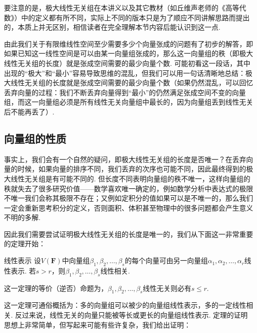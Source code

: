 要注意的是，极大线性无关组在本讲义以及其它教材（如丘维声老师的《高等代数》）中的定义都有所不同，实际上不同的版本只是为了顺应不同讲解思路而提出的，本质上并无区别，相信读者在完全理解本节内容后能认识到这一点.

由此我们关于有限维线性空间至少需要多少个向量张成的问题有了初步的解答，即如果已知这一线性空间是可以由某一向量组张成的，那么这一向量组的秩（即极大线性无关组的长度）就是张成空间需要的最少向量个数. 可能初看这一段话，其中出现的``极大''和``最小''容易导致思维的混乱，但我们可以用一句话清晰地总结：极大线性无关组的长度就是张成空间需要的最少向量个数（如果仍然混乱，可以回忆丢弃向量的过程：我们不断丢弃向量得到``最小''的仍然满足张成空间不变的向量组，而这一向量组必须是所有线性无关向量组中最长的，因为向量组丢到线性无关后不能再丢了）.

\subsection{向量组的性质}

事实上，我们会有一个自然的疑问，即极大线性无关组的长度是否唯一？在丢弃向量的时候，如果向量的排序不同，我们丢弃的次序也可能不同，因此最终得到的极大线性无关组是有可能不同的. 但长度不同表明向量组的秩不唯一，这样向量组的秩就失去了很多研究价值——数学喜欢唯一确定的，例如数学分析中表达式的极限不唯一我们会称其极限不存在；又例如定积分的值如果可以是不唯一的，那么我们一定会重新思考积分的定义，否则面积、体积甚至物理中的很多问题都会产生意义不明的多解.

因此我们需要尝试证明极大线性无关组的长度是唯一的，我们从下面这一非常重要的定理开始：
\begin{theorem}{}{线性表示}
    设$V(\mathbf{F})$中向量组$ \beta_1,\beta_2,\ldots,\beta_s $的每个向量可由另一向量组$\alpha_1,\alpha_2,\ldots,\alpha_r$线性表示. 若$s>r$，则$ \beta_1,\beta_2,\ldots,\beta_s $线性相关.
\end{theorem}
这一定理的等价（逆否）命题为，$ \beta_1,\beta_2,\ldots,\beta_s $线性无关则必有$s\leqslant r$.

这一定理可通俗概括为：多的向量组可以被少的向量组线性表示，多的一定线性相关. 反过来说，线性无关的向量只能被等长或更长的向量组线性表示. 定理的证明思想上非常简单，但写起来可能有些许复杂，我们给出证明：

